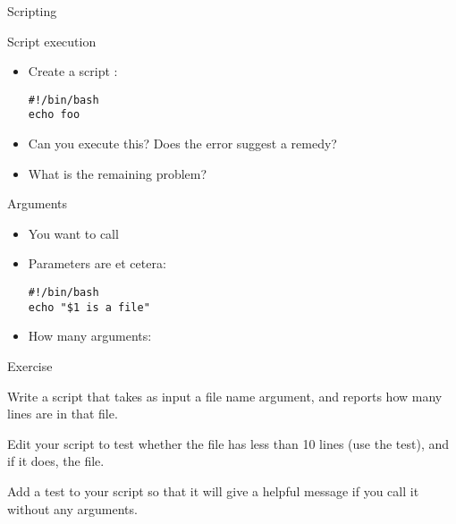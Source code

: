 \documentclass[11pt,headernav]{beamer}
\begin{document}
 {Scripting}

\begin{numberedframe}{Script execution}
  \label{sl-lnx:script}
  \begin{itemize}
  \item Create a script :
\begin{verbatim}
#!/bin/bash
echo foo
\end{verbatim}
\item Can you execute this? Does the error suggest a remedy?
\item What is the remaining problem?
  \end{itemize}
\end{numberedframe}

\begin{numberedframe}{Arguments}

  \begin{itemize}
  \item You want to call 
    \item Parameters are  et cetera:
\begin{verbatim}
#!/bin/bash
echo "$1 is a file"
\end{verbatim}
\item How many arguments: \n{$#}
  \end{itemize}
\end{numberedframe}

\begin{numberedframe}{Exercise}

  Write a script that takes as input a file name argument, and reports how many
  lines are in that file.

  Edit your script to test whether the file has less than 10 lines
  (use the  test), and if it does,  the
  file. 

  Add a
  test to your script so that it will give a helpful message if you call
  it without any arguments.

\end{numberedframe}
\end{document}
